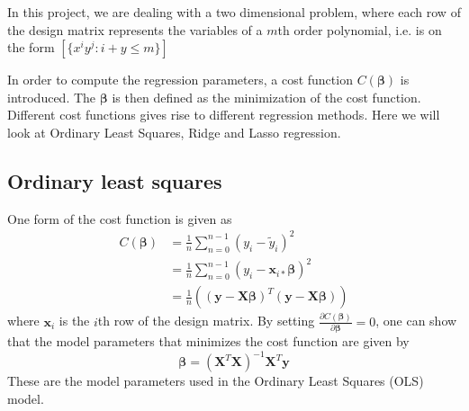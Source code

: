 In this project, we are dealing with a two dimensional problem, where each row of the design matrix represents the variables of a $m$th order polynomial, i.e. is on the form $[\{x^iy^j : i+y\leq m\}]$

In order to compute the regression parameters, a cost function $C(\boldsymbol{\beta})$ is introduced. The $\boldsymbol{\beta}$ is then defined as the minimization of the cost function. Different cost functions gives rise to different regression methods. Here we will look at Ordinary Least Squares, Ridge and Lasso regression. 

\subsection{Ordinary least squares}
One form of the cost function is given as
\begin{align*}
	C(\boldsymbol{\beta}) 
	&= \frac{1}{n}\sum_{n=0}^{n-1} \left(y_i-\tilde{y}_i\right)^2 \\
	&= \frac{1}{n}\sum_{n=0}^{n-1} \left(y_i-\boldsymbol{x}_{i*}\boldsymbol{\beta}\right)^2\\
	&=\frac{1}{n}\left(\left(\boldsymbol{y}-\boldsymbol{X\beta}\right)^T\left(\boldsymbol{y}-\boldsymbol{X\beta}\right)\right)
\end{align*}
where $\boldsymbol{x}_{i}$ is the $i$th row of the design matrix. By setting $\frac{\partial C(\boldsymbol{\beta})}{\partial\boldsymbol{\beta}}=0$, one can show that the model parameters that minimizes the cost function are given by
\begin{equation}\label{eq:ols}
	\boldsymbol{\beta}=\left(\boldsymbol{X}^T\boldsymbol{X}\right)^{-1}\boldsymbol{X}^T\boldsymbol{y}
\end{equation}
These are the model parameters used in the Ordinary Least Squares (OLS) model.

